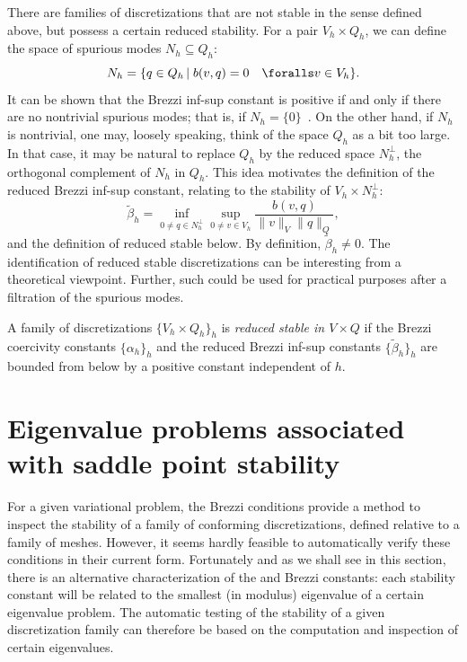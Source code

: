 There are families of discretizations that are not stable in the sense
defined above, but possess a certain reduced stability. For a pair
$V_h \times Q_h$, we can define the space of spurious modes $N_h
\subseteq Q_h$:
\begin{equation}
  N_h
  = \{q \in Q_h \, | \; b(v, q) = 0 \quad
  \foralls v \in V_h\}.
\end{equation}
It can be shown that the Brezzi inf-sup constant is positive if and
only if there are no nontrivial spurious modes; that is, if $N_h = \{
0 \}$~\citep{Qin1994}.  On the other hand, if $N_h$ is
nontrivial, one may, loosely speaking, think of the space $Q_h$ as a
bit too large.  In that case, it may be natural to replace $Q_h$ by
the reduced space $N_h^{\perp}$, the orthogonal complement of $N_h$ in
$Q_h$. This idea motivates the definition of the reduced Brezzi
inf-sup constant, relating to the stability of $V_h \times
N_h^{\perp}$:
\begin{equation}
  \label{rognes:eq:reduced:infsup}
  \tilde \beta_h =
  \inf_{0 \not = q \in N_h^{\perp}}
  \sup_{0 \not = v \in V_h}
  \frac{b(v, q)}
       {\|v\|_{V} \|q\|_{Q}},
\end{equation}
and the definition of reduced stable below. By definition, $\tilde
\beta_h \not = 0$. The identification of reduced stable
discretizations can be interesting from a theoretical
viewpoint. Further, such could be used for practical purposes after a
filtration of the spurious modes.
\begin{definition}
  \label{rognes:def:reduced_stable}
  A family of discretizations $\{V_h \times Q_h\}_h$ is \emph{reduced
    stable in $V \times Q$} if the Brezzi coercivity constants
  $\{\alpha_h\}_h$ and the reduced Brezzi inf-sup constants $\{ \tilde
  \beta_h \}_h$ are bounded from below by a positive constant
  independent of $h$.
\end{definition}


\section{Eigenvalue problems associated with saddle point stability}

For a given variational problem, the Brezzi conditions provide a
method to inspect the stability of a family of conforming
discretizations, defined relative to a family of meshes. However, it
seems hardly feasible to automatically verify these conditions in
their current form. Fortunately and as we shall see in this section,
there is an alternative characterization of the \babuska{} and Brezzi
constants: each stability constant will be related to the smallest (in
modulus) eigenvalue of a certain eigenvalue problem. The automatic
testing of the stability of a given discretization family can
therefore be based on the computation and inspection of certain
eigenvalues.

